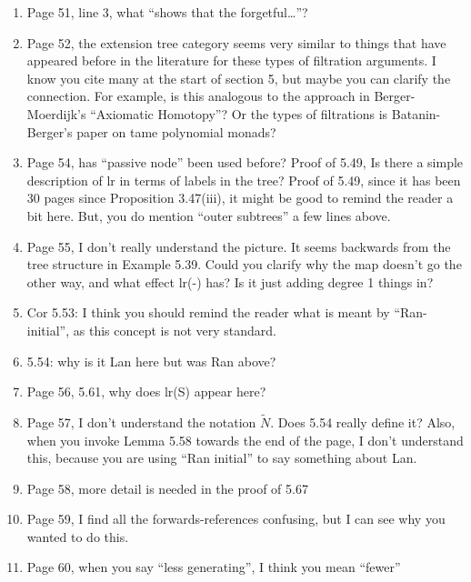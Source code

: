 \documentclass{article}
\begin{document}
\begin{enumerate}
\item
Page 51, line 3, what ``shows that the forgetful\dots''?

\item
Page 52, the extension tree category seems very similar to things that have appeared before in the literature for these types of filtration arguments. I know you cite many at the start of section 5, but maybe you can clarify the connection. For example, is this analogous to the approach in Berger-Moerdijk's ``Axiomatic Homotopy''? Or the types of filtrations is Batanin-Berger's paper on tame polynomial monads?

\item
Page 54, has ``passive node'' been used before?
Proof of 5.49, Is there a simple description of lr in terms of labels in the tree?
Proof of 5.49, since it has been 30 pages since Proposition 3.47(iii), it might be good to remind the reader a bit here. But, you do mention ``outer subtrees'' a few lines above.

\item
Page 55, I don't really understand the picture. It seems backwards from the tree structure in Example 5.39. Could you clarify why the map doesn't go the other way, and what effect lr(-) has? Is it just adding degree 1 things in?

\item
Cor 5.53: I think you should remind the reader what is meant by ``Ran-initial'', as this concept is not very standard.

\item
5.54: why is it Lan here but was Ran above?

\item
Page 56, 5.61, why does lr(S) appear here?

\item
Page 57, I don't understand the notation $\tilde{N}$. Does 5.54 really define it?
Also, when you invoke Lemma 5.58 towards the end of the page, I don't understand this, because you are using ``Ran initial'' to say something about Lan.

\item
Page 58, more detail is needed in the proof of 5.67

\item
Page 59, I find all the forwards-references confusing, but I can see why you wanted to do this.

\item
Page 60, when you say ``less generating'', I think you mean ``fewer''


\end{enumerate}
\end{document}
